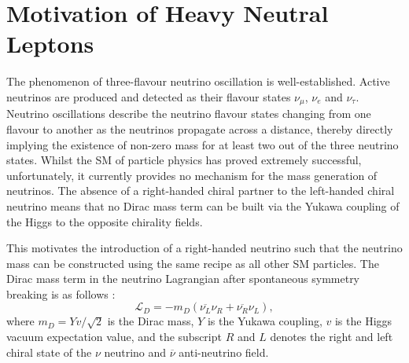 \section{Motivation of Heavy Neutral Leptons}
\label{sec2Overview}



The phenomenon of three-flavour neutrino oscillation is well-established.
Active neutrinos are produced and detected as their flavour states $\nu_\mu$, $\nu_e$ and $\nu_\tau$.
Neutrino oscillations describe the neutrino flavour states changing from one flavour to another as the neutrinos propagate across a distance, thereby directly implying the existence of non-zero mass for at least two out of the three neutrino states.
Whilst the SM of particle physics has proved extremely successful, unfortunately, it currently provides no mechanism for the mass generation of neutrinos.
The absence of a right-handed chiral partner to the left-handed chiral neutrino means that no Dirac mass term can be built via the Yukawa coupling of the Higgs to the opposite chirality fields.

This motivates the introduction of a right-handed neutrino such that the neutrino mass can be constructed using the same recipe as all other SM particles.
The Dirac mass term in the neutrino Lagrangian after spontaneous symmetry breaking is as follows \cite{Thomson}:
\begin{equation}
\mathcal{L}_{D} = -m_{D} \left(\overline{\nu_{L}}\nu_{R} + \overline{\nu_{R}}\nu_{L}\right),
\label{eq:dirac}
\end{equation}
where $m_{D} = Yv/\sqrt{2}$ is the Dirac mass, $Y$ is the Yukawa coupling, $v$ is the Higgs vacuum expectation value, and the subscript $R$ and $L$ denotes the right and left chiral state of the $\nu$ neutrino and $\overline{\nu}$ anti-neutrino field. 


